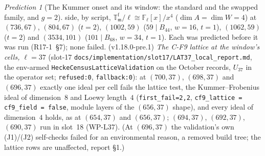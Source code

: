 \documentclass[11pt]{article}
\theoremstyle{remark}
\newtheorem{prediction}[theorem]{Prediction}
\newcommand{\F}{\mathbb{F}}
\newcommand{\Fl}{\F_\ell}
\newcommand{\T}{\mathbb{T}}
\newcommand{\m}{\mathfrak{m}}
\begin{document}
\begin{prediction}[The Kummer onset and its window: the standard and the swapped family, and $g=2$]
side, by script, $\T^{\mathrm f}_\m/\ell\cong\Fl[x]/x^4$ ($\dim A=\dim W=4$) at $(736,67)$, $(804,67)$ ($t=2$), $(1002,59)$ ($59\mid B_{44}$, $w=16$, $t=1$),
$(1062,59)$ ($t=2$) and $(3534,101)$ ($101\mid B_{68}$, $w=34$, $t=1$). Each was predicted before it was run (R17-1~\S7); none failed.
(v1.18.0-pre.1) \emph{The C-F9 lattice at the window's cells, $\ell=37$} (slot-17 \texttt{docs/implementation/slot17/LAT37\_local\_report.md}, the env-armed
\texttt{HeckeCensusLatticeValidation} on the October records, $U_{37}$ in the operator set; \texttt{refused:0}, \texttt{fallback:0}): at $(700,37)$, $(698,37)$
and $(696,37)$ exactly one ideal per cell fails the lattice test, the Kummer--Frobenius ideal of dimension~$8$ and Loewy length~$4$ (\texttt{first\_fail=2,2},
\texttt{cf9\_lattice = cf9\_field = false}, module layers of the $(656,37)$ shape), and every ideal of dimension~$4$ holds, as at $(654,37)$ and $(656,37)$;
$(694,37)$, $(692,37)$, $(690,37)$ run in slot~18 (WP-L37). (At $(696,37)$ the validation's own (J1)/(J2) self-checks failed for an environmental reason, a
removed build tree; the lattice rows are unaffected, report \S1.)


\end{prediction}
\end{document}
